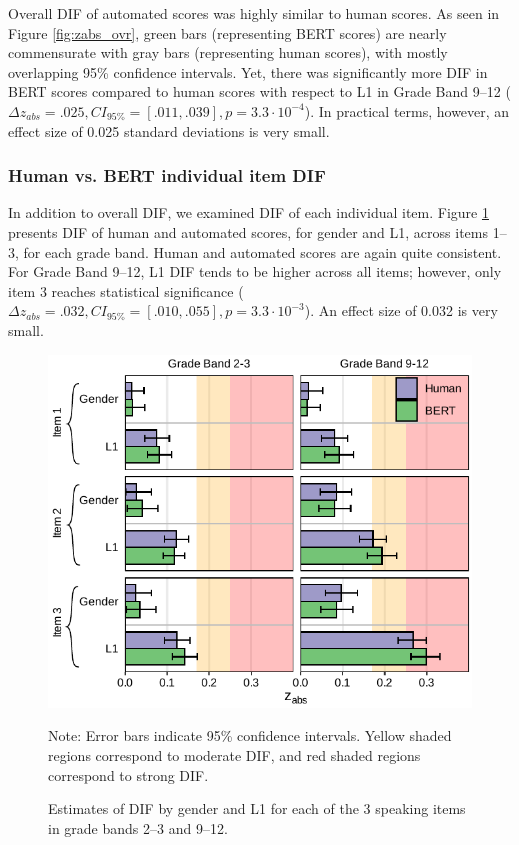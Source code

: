 \documentclass [PhD] {uclathes}
\begin{document}
Overall DIF of automated scores was highly similar to human scores. As seen in Figure \ref{fig:zabs_ovr}, green bars (representing BERT scores) are nearly commensurate with gray bars (representing human scores), with mostly overlapping 95\% confidence intervals. Yet, there was significantly more DIF in BERT scores compared to human scores with respect to L1 in Grade Band 9–12 ($\Delta z_{abs} = .025, CI_{95\%} = [.011, .039], p = 3.3 \cdot 10^{-4}$). In practical terms, however, an effect size of 0.025 standard deviations is very small. 

\subsubsection{Human vs. BERT individual item DIF}

In addition to overall DIF, we examined DIF of each individual item. Figure \ref{fig:zabs_itm} presents DIF of human and automated scores, for gender and L1, across items 1–3, for each grade band. Human and automated scores are again quite consistent. For Grade Band 9–12, L1 DIF tends to be higher across all items; however, only item 3 reaches statistical significance ($\Delta z_{abs} = .032, CI_{95\%} = [.010, .055], p = 3.3 \cdot 10^{-3}$). An effect size of 0.032 is very small.

\begin{figure}[h]
    \centering
    \caption{Estimates of DIF by gender and L1 for each of the 3 speaking items in grade bands 2–3 and 9–12.}    
    \includegraphics[width=5in]{figures/20230504_ETS-DIF_BERT_zabs_itm_edit.pdf}
    \label{fig:zabs_itm}
	{\newline Note: Error bars indicate 95\% confidence intervals. Yellow shaded regions correspond to moderate DIF, and red shaded regions correspond to strong DIF. \par}
\end{figure}
\end{document}
